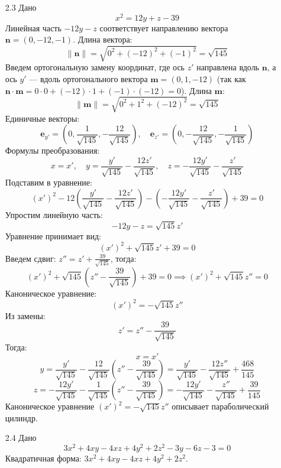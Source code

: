 \documentclass[a4paper]{article}
\begin{document}
\begin{enumerate}
\begin{enumerate}
    \item[2.3]Дано 
    \[x^2 = 12y + z - 39\]
    Линейная часть \(-12y - z\) соответствует направлению вектора \(\mathbf{n} = (0, -12, -1)\). Длина вектора:  
    \[ \|\mathbf{n}\| = \sqrt{0^2 + (-12)^2 + (-1)^2} = \sqrt{145} \]  
    Введем ортогональную замену координат, где ось \(z'\) направлена вдоль \(\mathbf{n}\), а ось \(y'\) — вдоль ортогонального вектора \(\mathbf{m} = (0, 1, -12)\) (так как \(\mathbf{n} \cdot \mathbf{m} = 0 \cdot 0 + (-12) \cdot 1 + (-1) \cdot (-12) = 0\)). Длина \(\mathbf{m}\):  
    \[ \|\mathbf{m}\| = \sqrt{0^2 + 1^2 + (-12)^2} = \sqrt{145} \]  
    Единичные векторы:  
    \[ \mathbf{e}_{y'} = \left(0, \frac{1}{\sqrt{145}}, -\frac{12}{\sqrt{145}}\right),
     \quad \mathbf{e}_{z'} = \left(0, -\frac{12}{\sqrt{145}},
      -\frac{1}{\sqrt{145}}\right) \]  
    Формулы преобразования:  
    \[ x = x', \quad y = \frac{y'}{\sqrt{145}} - \frac{12z'}{\sqrt{145}}, \quad z = -\frac{12y'}{\sqrt{145}} - \frac{z'}{\sqrt{145}} \]  
    Подставим в уравнение:  
    \[ (x')^2 - 12 \left( \frac{y'}{\sqrt{145}} - \frac{12z'}{\sqrt{145}} \right) - \left( -\frac{12y'}{\sqrt{145}} - \frac{z'}{\sqrt{145}} \right) + 39 = 0 \]  
    Упростим линейную часть:  
    \[ -12y - z = \sqrt{145}  z' \]  
    Уравнение принимает вид:  
    \[ (x')^2 + \sqrt{145}  z' + 39 = 0 \]  
    Введем сдвиг: \( z'' = z' + \frac{39}{\sqrt{145}} \), тогда:  
    \[ (x')^2 + \sqrt{145} \left( z'' - \frac{39}{\sqrt{145}} \right) + 39 = 0 \implies (x')^2 + \sqrt{145}  z'' = 0 \]  
    Каноническое уравнение:  
    \[ (x')^2 = -\sqrt{145}  z'' \]  
    Из замены:  
    \[ z' = z'' - \frac{39}{\sqrt{145}} \]  
    Тогда:  
    \[ x = x' \]  
    \[ y = \frac{y'}{\sqrt{145}} - \frac{12}{\sqrt{145}} \left( z'' - \frac{39}{\sqrt{145}} \right) = \frac{y'}{\sqrt{145}} - \frac{12z''}{\sqrt{145}} + \frac{468}{145} \]  
    \[ z = -\frac{12y'}{\sqrt{145}} - \frac{1}{\sqrt{145}} \left( z'' - \frac{39}{\sqrt{145}} \right) = -\frac{12y'}{\sqrt{145}} - \frac{z''}{\sqrt{145}} + \frac{39}{145} \]  
    Каноническое уравнение \((x')^2 = -\sqrt{145}  z''\) описывает параболический 
    цилиндр. \\

    \item[2.4]Дано 
    \[3x^2 + 4xy - 4xz + 4y^2 + 2z^2 - 3y - 6z - 3 = 0 \]
    Квадратичная форма: \( 3x^2 + 4xy - 4xz + 4y^2 + 2z^2 \).  


\end{enumerate}
\end{enumerate}
\end{document}
